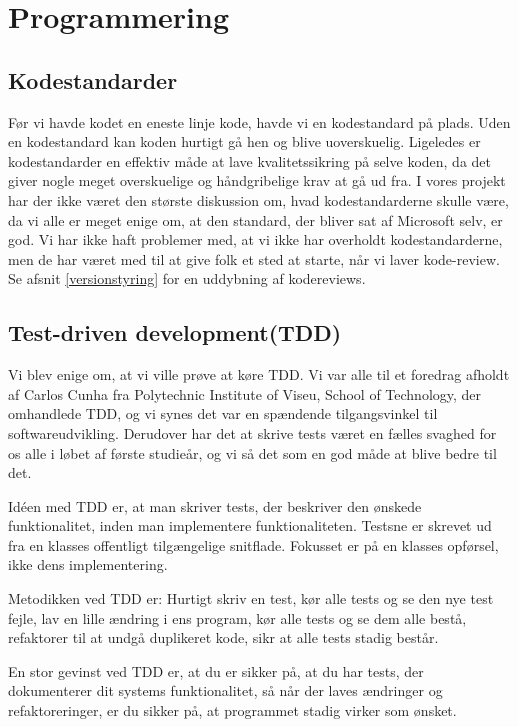 \section{Programmering}
\subsection{Kodestandarder}
\label{Kodestandarder}

Før vi havde kodet en eneste linje kode, havde vi en kodestandard på plads.
Uden en kodestandard kan koden hurtigt gå hen og blive uoverskuelig.
Ligeledes er kodestandarder en effektiv måde at lave kvalitetssikring på selve koden, da det giver nogle meget overskuelige og håndgribelige krav at gå ud fra.
I vores projekt har der ikke været den største diskussion om, hvad kodestandarderne skulle være, da vi alle er meget enige om, at den standard, der bliver sat af Microsoft selv, er god\cite{microsoftcsharp}. 
Vi har ikke haft problemer med, at vi ikke har overholdt kodestandarderne, men de har været med til at give folk et sted at starte, når vi laver kode-review. Se afsnit \ref{versionstyring} for en uddybning af kodereviews.

\subsection{Test-driven development(TDD)}
\label{TDD}

Vi blev enige om, at vi ville prøve at køre TDD.
Vi var alle til et foredrag afholdt af Carlos Cunha fra Polytechnic Institute of Viseu, School of Technology, der omhandlede TDD, og vi synes det var en spændende tilgangsvinkel til softwareudvikling.
Derudover har det at skrive tests været en fælles svaghed for os alle i løbet af første studieår, og vi så det som en god måde at blive bedre til det.

Idéen med TDD er, at man skriver tests, der beskriver den ønskede funktionalitet, inden man implementere funktionaliteten.
Testsne er skrevet ud fra en klasses offentligt tilgængelige snitflade.
Fokusset er på en klasses opførsel, ikke dens implementering.

Metodikken ved TDD er:
Hurtigt skriv en test, kør alle tests og se den nye test fejle, lav en lille ændring i ens program, kør alle tests og se dem alle bestå, refaktorer til at undgå duplikeret kode, sikr at alle tests stadig består.

En stor gevinst ved TDD er, at du er sikker på, at du har tests, der dokumenterer dit systems funktionalitet, så når der laves ændringer og refaktoreringer, er du sikker på, at programmet stadig virker som ønsket.

